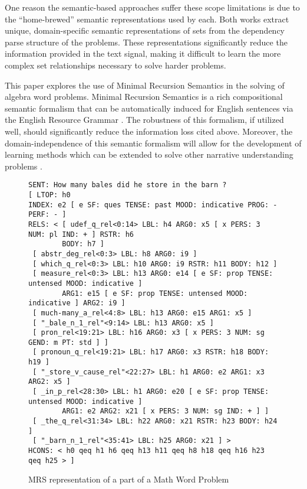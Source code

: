 One reason the semantic-based approaches suffer these scope limitations is due to the ``home-brewed'' semantic representations used by each.
Both works extract unique, domain-specific semantic representations of sets from the dependency parse structure of the problems. 
These representations significantly reduce the information provided in the text signal, making it difficult to learn the more complex set relationships necessary to solve harder problems.

This paper explores the use of Minimal Recursion Semantics \cite{copestake2005minimal} in the solving of algebra word problems. 
Minimal Recursion Semantics is a rich compositional semantic formalism that can be automatically induced for English sentences via the English Resource Grammar \cite{flickinger2000building,flickinger2011accuracy}. 
The robustness of this formalism, if utilized well, should significantly reduce the information loss cited above.
Moreover, the domain-independence of this semantic formalism will allow for the development of learning methods which can be extended to solve other narrative understanding problems \cite{bender-EtAl:2015:IWCS2015}.

\begin{figure*}[tb]
\begin{footnotesize}
\begin{verbatim}
SENT: How many bales did he store in the barn ?
[ LTOP: h0
INDEX: e2 [ e SF: ques TENSE: past MOOD: indicative PROG: - PERF: - ]
RELS: < [ udef_q_rel<0:14> LBL: h4 ARG0: x5 [ x PERS: 3 NUM: pl IND: + ] RSTR: h6 
        BODY: h7 ]
 [ abstr_deg_rel<0:3> LBL: h8 ARG0: i9 ]
 [ which_q_rel<0:3> LBL: h10 ARG0: i9 RSTR: h11 BODY: h12 ]
 [ measure_rel<0:3> LBL: h13 ARG0: e14 [ e SF: prop TENSE: untensed MOOD: indicative ] 
        ARG1: e15 [ e SF: prop TENSE: untensed MOOD: indicative ] ARG2: i9 ]
 [ much-many_a_rel<4:8> LBL: h13 ARG0: e15 ARG1: x5 ]
 [ "_bale_n_1_rel"<9:14> LBL: h13 ARG0: x5 ]
 [ pron_rel<19:21> LBL: h16 ARG0: x3 [ x PERS: 3 NUM: sg GEND: m PT: std ] ]
 [ pronoun_q_rel<19:21> LBL: h17 ARG0: x3 RSTR: h18 BODY: h19 ]
 [ "_store_v_cause_rel"<22:27> LBL: h1 ARG0: e2 ARG1: x3 ARG2: x5 ]
 [ _in_p_rel<28:30> LBL: h1 ARG0: e20 [ e SF: prop TENSE: untensed MOOD: indicative ] 
        ARG1: e2 ARG2: x21 [ x PERS: 3 NUM: sg IND: + ] ]
 [ _the_q_rel<31:34> LBL: h22 ARG0: x21 RSTR: h23 BODY: h24 ]
 [ "_barn_n_1_rel"<35:41> LBL: h25 ARG0: x21 ] >
HCONS: < h0 qeq h1 h6 qeq h13 h11 qeq h8 h18 qeq h16 h23 qeq h25 > ]
\end{verbatim}
\end{footnotesize}
\caption{MRS representation of a part of a Math Word Problem}
\label{fig:mrs}
\end{figure*}

